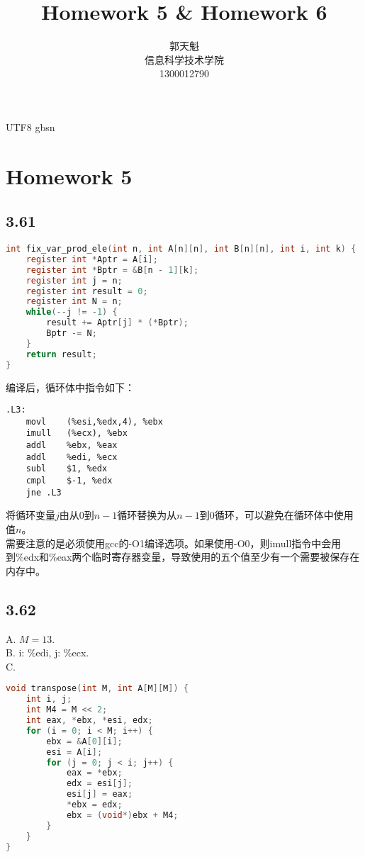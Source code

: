 \documentclass {article}
\begin{document}
  \begin {CJK*} {UTF8} {gbsn}
    \title {\textbf {\Huge Homework 5 \& Homework 6}}
		\author {郭天魁 \\ 信息科学技术学院 \\ 1300012790}

		\maketitle

		\section{Homework 5}
			\subsection{3.61}
				\begin{lstlisting}[language=C]
int fix_var_prod_ele(int n, int A[n][n], int B[n][n], int i, int k) {
	register int *Aptr = A[i];
	register int *Bptr = &B[n - 1][k];
	register int j = n;
	register int result = 0;
	register int N = n;
	while(--j != -1) {
		result += Aptr[j] * (*Bptr);
		Bptr -= N;
	}
	return result;
}
				\end{lstlisting}

				编译后，循环体中指令如下：
				\begin{lstlisting}[language={[x86masm]Assembler}]
.L3:
	movl	(%esi,%edx,4), %ebx
	imull	(%ecx), %ebx
	addl	%ebx, %eax
	addl	%edi, %ecx
	subl	$1, %edx
	cmpl	$-1, %edx
	jne	.L3
				\end{lstlisting}

				将循环变量$j$由从$0$到$n-1$循环替换为从$n-1$到$0$循环，可以避免在循环体中使用值$n$。\\

				需要注意的是必须使用gcc的-O1编译选项。如果使用-O0，则imull指令中会用到\%edx和\%eax两个临时寄存器变量，导致使用的五个值至少有一个需要被保存在内存中。\\

			\subsection{3.62}
				A. $M=13.$\\

				B. i: \%edi, j: \%ecx.\\

				C.
				\begin{lstlisting}[language=C]
void transpose(int M, int A[M][M]) {
	int i, j;
	int M4 = M << 2;
	int eax, *ebx, *esi, edx;
	for (i = 0; i < M; i++) {
		ebx = &A[0][i];
		esi = A[i];
		for (j = 0; j < i; j++) {
			eax = *ebx;
			edx = esi[j];
			esi[j] = eax;
			*ebx = edx;
			ebx = (void*)ebx + M4;
		}
	}
}
				\end{lstlisting}
			

\end{CJK*}
\end{document}
